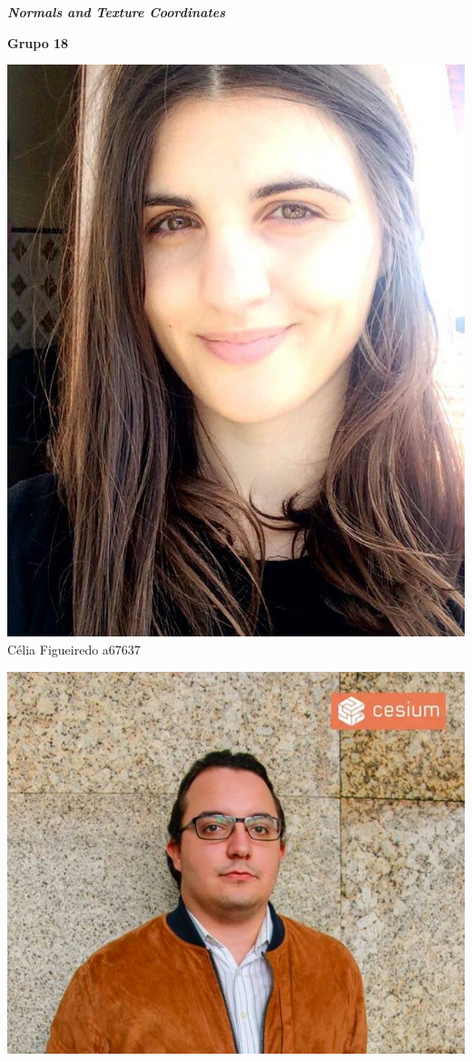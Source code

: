 \begin{titlepage}
\begin{center}
\Large \textbf{\textit{Normals and Texture Coordinates}}

\vspace{1.5cm}

{\Large \bfseries Grupo 18\\[2cm] }


\noindent\begin{minipage}[b]{.2\textwidth}
	\includegraphics[scale=0.18]{celia}
	\small{Célia Figueiredo a67637}
\end{minipage} 
\hfill
\begin{minipage}[b]{.2\textwidth}
	\includegraphics[scale=0.3]{luis}

\end{minipage}
\end{center}
\end{titlepage}
